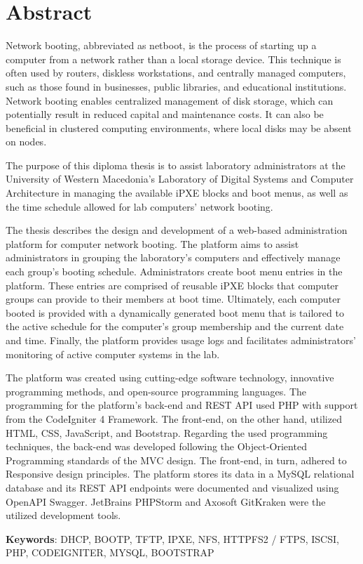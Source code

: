 \chapter*{Abstract}
Network booting, abbreviated as netboot, is the process of starting up a computer from a network rather than a local storage device. This technique is often used by routers, diskless workstations, and centrally managed computers, such as those found in businesses, public libraries, and educational institutions. Network booting enables centralized management of disk storage, which can potentially result in reduced capital and maintenance costs. It can also be beneficial in clustered computing environments, where local disks may be absent on nodes.

The purpose of this diploma thesis is to assist laboratory administrators at the University of Western Macedonia's Laboratory of Digital Systems and Computer Architecture in managing the available iPXE blocks and boot menus, as well as the time schedule allowed for lab computers' network booting.

The thesis describes the design and development of a web-based administration platform for computer network booting. The platform aims to assist administrators in grouping the laboratory's computers and effectively manage each group's booting schedule. Administrators create boot menu entries in the platform. These entries are comprised of reusable iPXE blocks that computer groups can provide to their members at boot time. Ultimately, each computer booted is provided with a dynamically generated boot menu that is tailored to the active schedule for the computer's group membership and the current date and time. Finally, the platform provides usage logs and facilitates administrators' monitoring of active computer systems in the lab.

The platform was created using cutting-edge software technology, innovative programming methods, and open-source programming languages. The programming for the platform's back-end and REST API used PHP with support from the CodeIgniter 4 Framework. The front-end, on the other hand, utilized HTML, CSS, JavaScript, and Bootstrap. Regarding the used programming techniques, the back-end was developed following the Object-Oriented Programming standards of the MVC design. The front-end, in turn, adhered to Responsive design principles. The platform stores its data in a MySQL relational database and its REST API endpoints were documented and visualized using OpenAPI Swagger. JetBrains PHPStorm and Axosoft GitKraken were the utilized development tools.

\vfill
\textbf{Keywords}: DHCP, BOOTP, TFTP, IPXE, NFS, HTTPFS2 / FTPS, ISCSI, PHP, CODEIGNITER, MYSQL, BOOTSTRAP